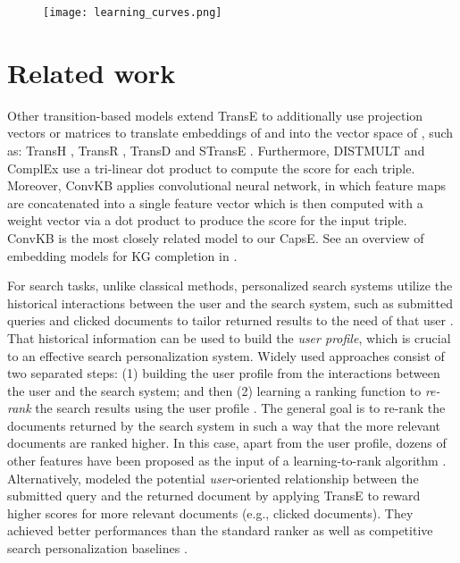 \documentclass[11pt,a4paper]{article}
\begin{document}
\begin{figure}[!t]
\centering
\texttt{[image: learning\_curves.png]}
\label{fig:learningcurves}
\end{figure}

\section{Related work}



Other transition-based models extend TransE to additionally use projection vectors or matrices to translate embeddings of  and  into the vector space of , such as: TransH \citep{AAAI148531}, TransR \citep{AAAI159571}, TransD \citep{ji-EtAl:2015:ACL-IJCNLP} and STransE \citep{NguyenNAACL2016}. 
Furthermore, DISTMULT \citep{Yang2015} and ComplEx \citep{Trouillon2016} use a tri-linear dot product to compute the score for each triple. 
Moreover, ConvKB \citep{Nguyen2018} applies convolutional neural network, in which 
feature maps are concatenated into a single feature vector which is then computed with a weight vector via a dot product to produce the score for the input triple. ConvKB is the most closely related model to our CapsE. See  an overview of embedding models for KG completion in \citep{Nguyen2017}.  


For search tasks, unlike classical methods, personalized search systems utilize the historical interactions  between the user and the search system, such as submitted queries and clicked documents to tailor returned  results to the need of that user \citep{Teevan2005,Teevan2009}. 
That historical information can be used to build the \emph{user profile}, which is crucial to an effective search personalization system. 
Widely used approaches consist of two separated steps: (1) building the user profile from the interactions between the user and the search system; and then (2) learning a ranking function to \emph{re-rank} the search results using the user profile \citep{Bennett2012,WhiteE2013,HarveyB2013,Vu2015}. 
The general goal is to re-rank the documents returned by the search system in such a way that the more relevant documents are ranked higher.
In this case, apart from the user profile, dozens of other features have been proposed as the input of a learning-to-rank algorithm \citep{Bennett2012,WhiteE2013}. 
Alternatively, \citet{vu2017search} modeled the potential  \textit{user}-oriented relationship between the submitted query and the returned document by applying TransE to reward higher scores for more relevant documents (e.g., clicked documents). They achieved better performances than the standard ranker as well as competitive search personalization baselines \citep{Teevan2011,Bennett2012,Vu2015}.
\end{document}
